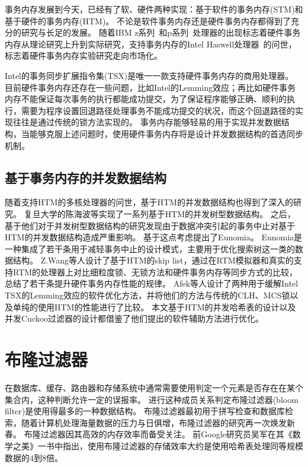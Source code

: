 事务内存发展到今天，已经有了软、硬件两种实现：基于软件的事务内存(STM)和基于硬件的事务内存(HTM)。
不论是软件事务内存\cite{spear2010lightweight,saha2006mcrt,shavit1997software,linfei2010,wangruibo2007}还是硬件事务内存\cite{yen2007logtm,moore2006logtm,dalessandro2011hybrid,wangzhaoguo2014}都得到了充分的研究与长足的发展。
随着IBM z系列~\cite{Cain2013Robust}和p系列~\cite{Wang2012Evaluation}处理器的出现标志着硬件事务内存从理论研究上升到实际研究，支持事务内存的Intel Haswell处理器~\cite{Intel2015Intel}的问世，标志着硬件事务内存实验研究走向市场化。

Intel的事务同步扩展指令集(TSX)是唯一一款支持硬件事务内存的商用处理器。
目前硬件事务内存还存在一些问题，比如Intel的Lemming效应\cite{Afek2014Software}；再比如硬件事务内存不能保证每次事务的执行都能成功提交，为了保证程序能够正确、顺利的执行，需要为程序设置回退路径处理事务不能成功提交的状况，而这个回退路径的实现往往是通过传统的锁方法实现的。
事务内存能够轻易的用于实现并发数据结构，当能够克服上述问题时，使用硬件事务内存将是设计并发数据结构的首选同步机制。

\subsection{基于事务内存的并发数据结构}

随着支持HTM的多核处理器的问世，基于HTM的并发数据结构也得到了深入的研究。
复旦大学的陈海波等实现了一系列基于HTM的并发树型数据结构\cite{wang2014using,wei2015fast,chen2016fast}。
之后，基于他们对于并发树型数据结构的研究发现由于数据冲突引起的事务中止对基于HTM的并发数据结构造成严重影响。
基于这点考虑提出了Eunomia\cite{wang2017eunomia}。
Eunomia是一种集成了若干条用于减轻事务中止的设计模式，主要用于优化搜索树这一类的数据结构。
Z.Wang等人设计了基于HTM的skip list\cite{wang2013opportunities}，通过在RTM模拟器和真实的支持RTM的处理器上对比细粒度锁、无锁方法和硬件事务内存等同步方式的比较，总结了若干条提升硬件事务内存性能的规律。
Afek\cite{Afek2014Software}等人设计了两种用于缓解Intel TSX的Lemming效应的软件优化方法，并将他们的方法与传统的CLH、MCS锁以及单纯的使用HTM的性能进行了比较。
本文基于HTM的并发哈希表的设计以及并发Cuckoo过滤器的设计都借鉴了他们提出的软件辅助方法进行优化。

\section{布隆过滤器}

在数据库、缓存、路由器和存储系统中通常需要使用判定一个元素是否存在在某个集合内，这种判断允许一定的误报率。
进行这种成员关系判定布隆过滤器(bloom filter)是使用得最多的一种数据结构\cite{bloom1970space}。
布隆过滤器最初用于拼写检查和数据库检索，随着计算机处理海量数据的压力与日俱增，布隆过滤器的研究再一次焕发新春\cite{xiekun2009}。
布隆过滤器因其高效的内存效率而备受关注。
前Google研究员吴军\cite{吴军2012数学之美}在其《数学之美》一书中指出，使用布隆过滤器的存储效率大约是使用哈希表处理同等规模数据的4到8倍。


